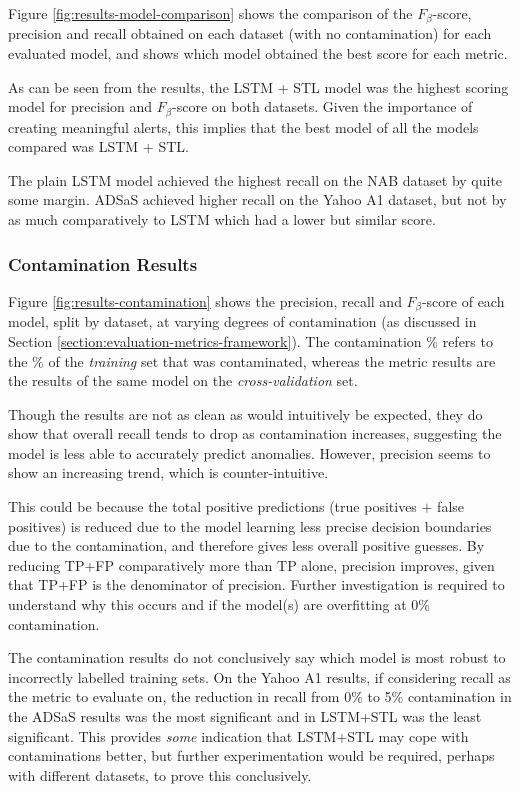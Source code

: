 \documentclass{mpaper}
\begin{document}
Figure \ref{fig:results-model-comparison} shows the comparison of the $F_\beta$-score, precision and recall obtained on each dataset (with no contamination) for each evaluated model, and shows which model obtained the best score for each metric.

As can be seen from the results, the LSTM + STL model was the highest scoring model for precision and $F_\beta$-score on both datasets. Given the importance of creating meaningful alerts, this implies that the best model of all the models compared was LSTM + STL.

The plain LSTM model achieved the highest recall on the NAB dataset by quite some margin. ADSaS achieved higher recall on the Yahoo A1 dataset, but not by as much comparatively to LSTM which had a lower but similar score.

\subsubsection{Contamination Results}
\label{section:contamination-results}

Figure \ref{fig:results-contamination} shows the precision, recall and $F_\beta$-score of each model, split by dataset, at varying degrees of contamination (as discussed in Section \ref{section:evaluation-metrics-framework}). The contamination \% refers to the \% of the \textit{training} set that was contaminated, whereas the metric results are the results of the same model on the \textit{cross-validation} set.

Though the results are not as clean as would intuitively be expected, they do show that overall recall tends to drop as contamination increases, suggesting the model is less able to accurately predict anomalies. However, precision seems to show an increasing trend, which is counter-intuitive. 

This could be because the total positive predictions (true positives $+$ false positives) is reduced due to the model learning less precise decision boundaries due to the contamination, and therefore gives less overall positive guesses. By reducing TP+FP comparatively more than TP alone, precision improves, given that TP+FP is the denominator of precision. Further investigation is required to understand why this occurs and if the model(s) are overfitting at 0\% contamination.

The contamination results do not conclusively say which model is most robust to incorrectly labelled training sets. On the Yahoo A1 results, if considering recall as the metric to evaluate on, the reduction in recall from 0\% to 5\% contamination in the ADSaS results was the most significant and in LSTM+STL was the least significant. This provides \textit{some} indication that LSTM+STL may cope with contaminations better, but further experimentation would be required, perhaps with different datasets, to prove this conclusively.
\end{document}
